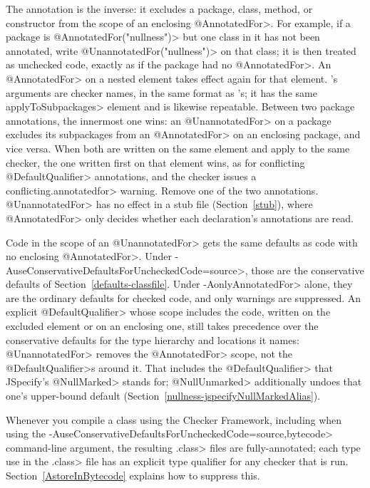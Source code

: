 The  annotation is the inverse:
it excludes a package, class, method, or constructor from the scope of an
enclosing \<@AnnotatedFor>.  For example, if a package is
\<@AnnotatedFor("nullness")> but one class in it has not been annotated, write
\<@UnannotatedFor("nullness")> on that class; it is then treated as unchecked
code, exactly as if the package had no \<@AnnotatedFor>.  An \<@AnnotatedFor>
on a nested element takes effect again for that element.
's arguments are checker names,
in the same format as 's; it has
the same \<applyToSubpackages> element and is likewise repeatable.  Between
two package annotations, the innermost one wins:  an \<@UnannotatedFor> on a
package excludes its subpackages from an \<@AnnotatedFor> on an enclosing
package, and vice versa.  When both are written on the same element and apply
to the same checker, the one written first on that element wins, as for
conflicting \<@DefaultQualifier> annotations, and the checker issues a
\<conflicting.annotatedfor> warning.  Remove one of the two annotations.  \<@UnannotatedFor> has no effect in
a stub file (Section~\ref{stub}), where \<@AnnotatedFor> only decides whether
each declaration's annotations are read.

Code in the scope of an \<@UnannotatedFor> gets the same defaults as code
with no enclosing \<@AnnotatedFor>.  Under
\<-AuseConservativeDefaultsForUncheckedCode=source>, those are the
conservative defaults of Section~\ref{defaults-classfile}.  Under
\<-AonlyAnnotatedFor> alone, they are the ordinary defaults for checked code,
and only warnings are suppressed.  An explicit \<@DefaultQualifier> whose
scope includes the code, written on the excluded element or on an enclosing
one, still takes precedence over the conservative defaults for the type
hierarchy and locations it names:  \<@UnannotatedFor> removes the
\<@AnnotatedFor> scope, not the \<@DefaultQualifier>s around it.  That
includes the \<@DefaultQualifier> that JSpecify's \<@NullMarked> stands for;
\<@NullUnmarked> additionally undoes that one's upper-bound default
(Section~\ref{nullness-jspecifyNullMarkedAlias}).

\begin{sloppypar}
Whenever you compile a class using the Checker Framework, including when
using the \<-AuseConservativeDefaultsForUncheckedCode=source,bytecode> command-line
argument, the resulting \<.class> files are fully-annotated; each type use
in the \<.class> file has an explicit type qualifier for any checker that
is run.  Section~\ref{AstoreInBytecode} explains how to suppress this.
\end{sloppypar}


